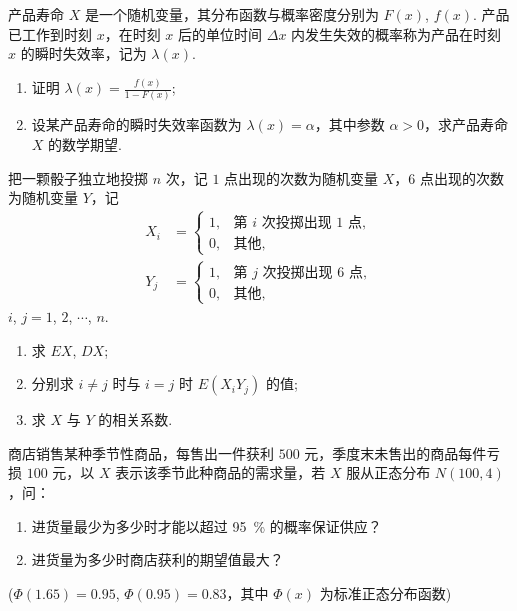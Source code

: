 	\begin{titwo}
		产品寿命 $X$ 是一个随机变量，其分布函数与概率密度分别为 $F(x)$, $f(x)$. 产品已工作到时刻 $x$，在时刻 $x$ 后的单位时间 $\Delta x$ 内发生失效的概率称为产品在时刻 $x$ 的瞬时失效率，记为 $\lambda(x)$.
		\begin{enumerate}
			\item 证明 $\lambda(x) = \frac{f(x)}{1 - F(x)}$;
			\item 设某产品寿命的瞬时失效率函数为 $\lambda(x) = \alpha$，其中参数 $\alpha > 0$，求产品寿命 $X$ 的数学期望.
		\end{enumerate}
	\end{titwo}

	\begin{titwo}
		把一颗骰子独立地投掷 $n$ 次，记 $1$ 点出现的次数为随机变量 $X$，$6$ 点出现的次数为随机变量 $Y$，记
		\begin{align*}
		X_{i} &= \begin{cases}
			1, & \text{第 $i$ 次投掷出现 $1$ 点}, \\
			0, & \text{其他},
		\end{cases} \\
		Y_{j} &= \begin{cases}
			1, & \text{第 $j$ 次投掷出现 $6$ 点}, \\
			0, & \text{其他},
		\end{cases}
		\end{align*}
		$i$, $j = 1$, $2$, $\cdots$, $n$.
		\begin{enumerate}
			\item 求 $EX$, $DX$;
			\item 分别求 $i \ne j$ 时与 $i = j$ 时 $E(X_{i} Y_{j})$ 的值;
			\item 求 $X$ 与 $Y$ 的相关系数.
		\end{enumerate}
	\end{titwo}

	\begin{titwo}
		商店销售某种季节性商品，每售出一件获利 $500$ 元，季度末未售出的商品每件亏损 $100$ 元，以 $X$ 表示该季节此种商品的需求量，若 $X$ 服从正态分布 $N(100,4)$，问：
		\begin{enumerate}
			\item 进货量最少为多少时才能以超过 \SI{95}{\percent} 的概率保证供应？
			\item 进货量为多少时商店获利的期望值最大？
		\end{enumerate}
		($\varPhi(1.65) = 0.95$, $\varPhi(0.95) = 0.83$，其中 $\varPhi(x)$ 为标准正态分布函数)
	\end{titwo}

